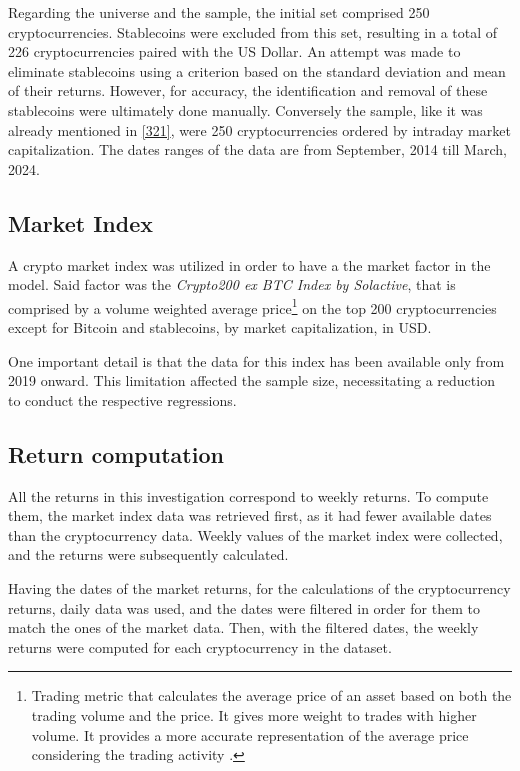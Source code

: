 Regarding the universe and the sample, the initial set comprised 250 cryptocurrencies. Stablecoins were excluded from this set, resulting in a total of 226 cryptocurrencies paired with the US Dollar. An attempt was made to eliminate stablecoins using a criterion based on the standard deviation and mean of their returns. However, for accuracy, the identification and removal of these stablecoins were ultimately done manually. Conversely the sample, like it was already mentioned in \ref{321}, were 250 cryptocurrencies ordered by intraday market capitalization. The dates ranges of the data are from September, 2014 till March, 2024.

\subsection{Market Index}
A crypto market index was utilized in order to have a the market factor in the model. Said factor was the \textit{Crypto200 ex BTC Index by Solactive}, that is comprised by a volume weighted average price\footnote{Trading metric that calculates the average price of an asset based on both the trading volume and the price. It gives more weight to trades with higher volume. It provides a more accurate representation of the average price considering the trading activity \parencite{solactive_crypto200_2024}.} on the top 200 cryptocurrencies except for Bitcoin and stablecoins, by market capitalization, in USD.

One important detail is that the data for this index has been available only from 2019 onward. This limitation affected the sample size, necessitating a reduction to conduct the respective regressions.

\subsection{Return computation}
All the returns in this investigation correspond to weekly returns. To compute them, the market index data was retrieved first, as it had fewer available dates than the cryptocurrency data. Weekly values of the market index were collected, and the returns were subsequently calculated.

Having the dates of the market returns, for the calculations of the cryptocurrency returns, daily data was used, and the dates were filtered in order for them to match the ones of the market data. Then, with the filtered dates, the weekly returns were computed for each cryptocurrency in the dataset.


